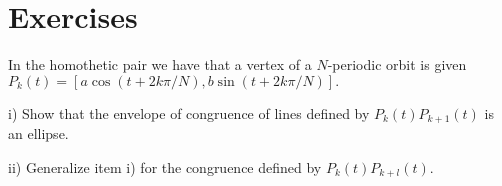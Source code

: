  
\section{Exercises}
\label{app:C-exercises}
\begin{exercise} In the homothetic pair we have that a vertex of a $N$-periodic orbit is given $P_k(t)=[a\cos(t+2 k\pi/N ), b\sin(t+2k\pi/N)].$ 

\noindent i) Show that the envelope of congruence of lines
defined by $P_{k}(t)P_{k+1}(t)$ is an ellipse.

\noindent ii) Generalize item i) for the congruence defined by $P_{k}(t)P_{k+l}(t)$.

\label{exe:appB-01-envelope}
\end{exercise}